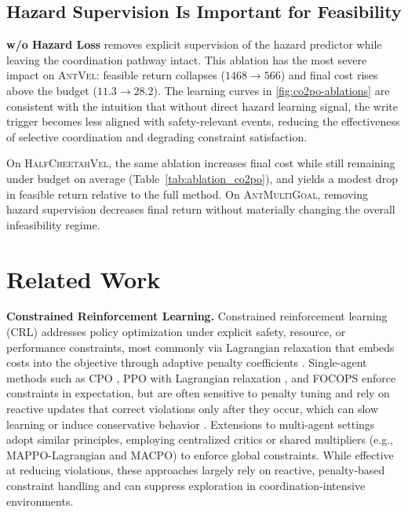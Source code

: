 \documentclass{article}
\theoremstyle{plain}
\theoremstyle{definition}
\theoremstyle{remark}
\begin{document}
\subsection{Hazard Supervision Is Important for Feasibility}
\label{sec:ablate-hazard}

\textbf{w/o Hazard Loss} removes explicit supervision of the hazard predictor while leaving the coordination pathway intact.
This ablation has the most severe impact on \textsc{AntVel}: feasible return collapses ($1468\!\rightarrow\!566$) and final cost rises above the budget ($11.3\!\rightarrow\!28.2$).
The learning curves in \cref{fig:co2po-ablations} are consistent with the intuition that without direct hazard learning signal, the write trigger becomes less aligned with safety-relevant events, reducing the effectiveness of selective coordination and degrading constraint satisfaction.

On \textsc{HalfCheetahVel}, the same ablation increases final cost while still remaining under budget on average (Table~\ref{tab:ablation_co2po}), and yields a modest drop in feasible return relative to the full method.
On \textsc{AntMultiGoal}, removing hazard supervision decreases final return without materially changing the overall infeasibility regime.


\section{Related Work}
\label{sec:related}

\textbf{Constrained Reinforcement Learning.}
Constrained reinforcement learning (CRL) addresses policy optimization under explicit safety, resource, or performance constraints, most commonly via Lagrangian relaxation that embeds costs into the objective through adaptive penalty coefficients \cite{zhang2019marlsurvey}.
Single-agent methods such as CPO \cite{achiam2017constrainedpolicyoptimization}, PPO with Lagrangian relaxation \cite{ray2019safexp}, and FOCOPS \cite{zhang2020orderconstrainedoptimizationpolicy} enforce constraints in expectation, but are often sensitive to penalty tuning and rely on reactive updates that correct violations only after they occur, which can slow learning or induce conservative behavior \cite{stooke2020responsive}.
Extensions to multi-agent settings adopt similar principles, employing centralized critics or shared multipliers (e.g., MAPPO-Lagrangian and MACPO) to enforce global constraints.
While effective at reducing violations, these approaches largely rely on reactive, penalty-based constraint handling and can suppress exploration in coordination-intensive environments.
\end{document}

